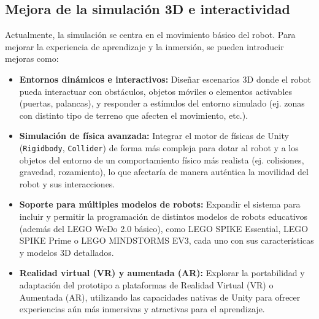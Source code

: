 \subsection{Mejora de la simulación 3D e interactividad}
Actualmente, la simulación se centra en el movimiento básico del robot. Para mejorar la experiencia de aprendizaje y la inmersión, se pueden introducir mejoras como:
\begin{itemize}
	\item \textbf{Entornos dinámicos e interactivos:} Diseñar escenarios 3D donde el robot pueda interactuar con obstáculos, objetos móviles o elementos activables (puertas, palancas), y responder a estímulos del entorno simulado (ej. zonas con distinto tipo de terreno que afecten el movimiento, etc.).
	\item \textbf{Simulación de física avanzada:} Integrar el motor de físicas de Unity (\texttt{Rigidbody}, \texttt{Collider}) de forma más compleja para dotar al robot y a los objetos del entorno de un comportamiento físico más realista (ej. colisiones, gravedad, rozamiento), lo que afectaría de manera auténtica la movilidad del robot y sus interacciones.
	\item \textbf{Soporte para múltiples modelos de robots:} Expandir el sistema para incluir y permitir la programación de distintos modelos de robots educativos (además del LEGO WeDo 2.0 básico), como LEGO SPIKE Essential, LEGO SPIKE Prime o LEGO MINDSTORMS EV3, cada uno con sus características y modelos 3D detallados.
	\item \textbf{Realidad virtual (VR) y aumentada (AR):} Explorar la portabilidad y adaptación del prototipo a plataformas de Realidad Virtual (VR) o Aumentada (AR), utilizando las capacidades nativas de Unity para ofrecer experiencias aún más inmersivas y atractivas para el aprendizaje.
\end{itemize}

